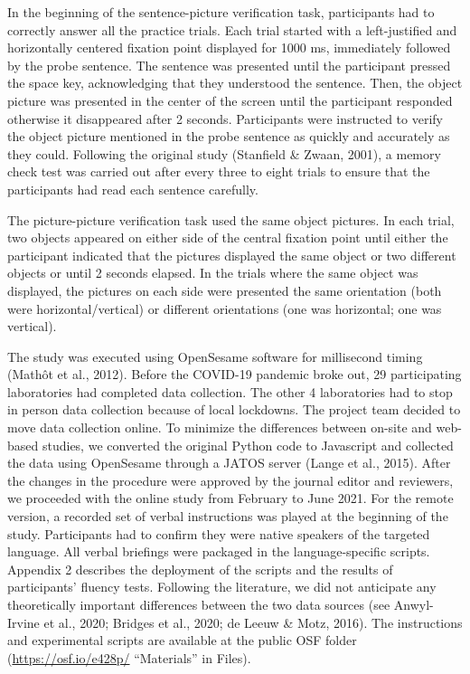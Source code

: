 \documentclass[
  man,floatsintext]{apa6}
\begin{document}
In the beginning of the sentence-picture verification task, participants had to correctly answer all the practice trials. Each trial started with a left-justified and horizontally centered fixation point displayed for 1000 ms, immediately followed by the probe sentence. The sentence was presented until the participant pressed the space key, acknowledging that they understood the sentence. Then, the object picture was presented in the center of the screen until the participant responded otherwise it disappeared after 2 seconds. Participants were instructed to verify the object picture mentioned in the probe sentence as quickly and accurately as they could. Following the original study (Stanfield \& Zwaan, 2001), a memory check test was carried out after every three to eight trials to ensure that the participants had read each sentence carefully.

The picture-picture verification task used the same object pictures. In each trial, two objects appeared on either side of the central fixation point until either the participant indicated that the pictures displayed the same object or two different objects or until 2 seconds elapsed. In the trials where the same object was displayed, the pictures on each side were presented the same orientation (both were horizontal/vertical) or different orientations (one was horizontal; one was vertical).

The study was executed using OpenSesame software for millisecond timing (Mathôt et al., 2012). Before the COVID-19 pandemic broke out, 29 participating laboratories had completed data collection. The other 4 laboratories had to stop in person data collection because of local lockdowns. The project team decided to move data collection online. To minimize the differences between on-site and web-based studies, we converted the original Python code to Javascript and collected the data using OpenSesame through a JATOS server (Lange et al., 2015). After the changes in the procedure were approved by the journal editor and reviewers, we proceeded with the online study from February to June 2021. For the remote version, a recorded set of verbal instructions was played at the beginning of the study. Participants had to confirm they were native speakers of the targeted language. All verbal briefings were packaged in the language-specific scripts. Appendix 2 describes the deployment of the scripts and the results of participants' fluency tests. Following the literature, we did not anticipate any theoretically important differences between the two data sources (see Anwyl-Irvine et al., 2020; Bridges et al., 2020; de Leeuw \& Motz, 2016). The instructions and experimental scripts are available at the public OSF folder (\url{https://osf.io/e428p/} ``Materials'' in Files).
\end{document}
